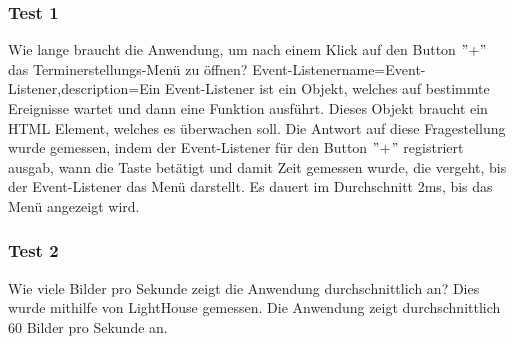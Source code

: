\subsubsection{Test 1}\label{subsubsec:test-1}
\newline
\newline
Wie lange braucht die Anwendung, um nach einem Klick auf den Button \("\)+\("\) das Terminerstellungs-Menü zu öffnen?
\gls{Event-Listener}{name={Event-Listener},description={Ein Event-Listener ist ein Objekt, welches auf bestimmte Ereignisse wartet und dann eine Funktion ausführt. Dieses Objekt braucht ein HTML Element, welches es überwachen soll.}}
Die Antwort auf diese Fragestellung wurde gemessen, indem der Event-Listener für den Button \("\)+\("\) registriert ausgab, wann die Taste betätigt und damit Zeit gemessen wurde, die vergeht, bis der \gls{Event-Listener} das Menü darstellt.
Es dauert im Durchschnitt 2ms, bis das Menü angezeigt wird.
\newline
\newline
\subsubsection{Test 2}\label{subsubsec:test-2}
\newline
\newline
Wie viele Bilder pro Sekunde zeigt die Anwendung durchschnittlich an?
Dies wurde mithilfe von LightHouse gemessen.
Die Anwendung zeigt durchschnittlich 60 Bilder pro Sekunde an.
\newline
\newline
